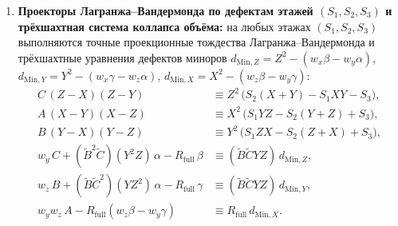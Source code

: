 \begin{theorem}
\begin{enumerate}[label=\textbf{(\arabic*)},leftmargin=*]
  для калибровочно-сдвинутого семейства $(\alpha(t), \beta(t)) = \bigl(u_0 Z^2 + t w_x,\ v_0 Z^2 + t w_y\bigr)$ и квадратичных валов $A^*(t) = \alpha(t) X^2$, $B^*(t) = \beta(t) Y^2$ кубический вронскиан $W^*(t) := A B^*(t) - B A^*(t)$ не зависит от калибровочного параметра $t$ ($\Delta_t W^*(t) \equiv 0$, сохранение Нётер) и удовлетворяет тождествам:
  \begin{align}
    w_x\,\beta(t) - w_y\,\alpha(t) &\equiv d_{\mathrm{Bez}}\,Z^2, \label{eq:math-ms-minor-z2} \\
    W^*(t) := A\,B^*(t) - B\,A^*(t) &\equiv d_{\mathrm{Bez}}\,(X^2 Y^2 Z^2), \label{eq:math-ms-cubic-wronskian} \\
    d_{\mathrm{Bez}}\,(A B C) &\equiv R_{\mathrm{full}}\,W^*(t), \label{eq:math-volume-wronskian-equiv} \\
    -\det\mathcal{W}_{\mathrm{MS}} &\equiv d_{\mathrm{Bez}}\,\bigl(X^4 + Y^4 + Z^4\bigr) + \bigl(Y^2 u_0 - X^2 v_0\bigr)\,S_3. \label{eq:math-ms-fourth-power-det}
  \end{align}
\item \textbf{Проекторы Лагранжа--Вандермонда по дефектам этажей $(S_1, S_2, S_3)$ и трёхшахтная система коллапса объёма:}
  на любых этажах $(S_1, S_2, S_3)$ выполняются точные проекционные тождества Лагранжа--Вандермонда и трёхшахтные уравнения дефектов миноров $d_{\mathrm{Min},Z} = Z^2 - (w_x\beta - w_y\alpha)$, $d_{\mathrm{Min},Y} = Y^2 - (w_x\gamma - w_z\alpha)$, $d_{\mathrm{Min},X} = X^2 - (w_z\beta - w_y\gamma)$:
  \begin{align}
    C\,(Z - X)(Z - Y) &\equiv Z^2\,\bigl(S_2(X + Y) - S_1 X Y - S_3\bigr), \label{eq:math-vandermonde-proj-c} \\
    A\,(X - Y)(X - Z) &\equiv X^2\,\bigl(S_1 Y Z - S_2(Y + Z) + S_3\bigr), \label{eq:math-vandermonde-proj-a} \\
    B\,(Y - X)(Y - Z) &\equiv Y^2\,\bigl(S_1 Z X - S_2(Z + X) + S_3\bigr), \label{eq:math-vandermonde-proj-b} \\
    w_y\,C + (\widetilde{B}^2\widetilde{C})(Y^2 Z)\,\alpha - R_{\mathrm{full}}\,\beta &\equiv (\widetilde{B}\widetilde{C}Y Z)\,d_{\mathrm{Min},Z}, \label{eq:math-three-shaft-collapse-c} \\
    w_z\,B + (\widetilde{B}\widetilde{C}^2)(Y Z^2)\,\alpha - R_{\mathrm{full}}\,\gamma &\equiv (\widetilde{B}\widetilde{C}Y Z)\,d_{\mathrm{Min},Y}, \label{eq:math-three-shaft-collapse-b} \\
    w_y w_z\,A - R_{\mathrm{full}}(w_z\beta - w_y\gamma) &\equiv R_{\mathrm{full}}\,d_{\mathrm{Min},X}. \label{eq:math-three-shaft-collapse-a}

\end{align}
\end{enumerate}
\end{theorem}
